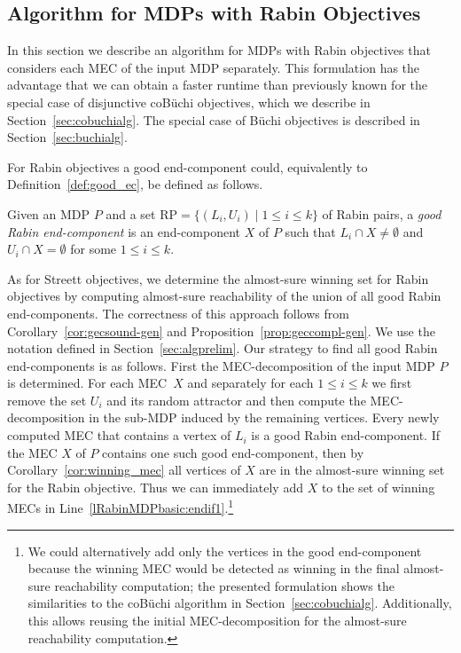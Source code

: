 \documentclass[11pt,letterpaper]{article}
\renewcommand{\RP}{\mathrm{RP}}
\newcommand{\mdp}{P\xspace}
\newcommand{\ec}{X\xspace}
\begin{document}
\subsection{Algorithm for MDPs with Rabin Objectives}
In this section we describe an algorithm for MDPs with Rabin objectives that 
considers each MEC of the input MDP separately. This formulation has the 
advantage that we can obtain a faster runtime than previously known 
for the special case of disjunctive coB{\"u}chi objectives, which we describe in
Section~\ref{sec:cobuchialg}. The special case of B{\"u}chi objectives is 
described in Section~\ref{sec:buchialg}.

For Rabin objectives a good end-component could, equivalently to 
Definition~\ref{def:good_ec}, be defined as follows.
\begin{definition}\label{def:good_rabin_ec}
  Given an MDP $\mdp$ and a set $\RP= \{(L_i, U_i) \mid 1 \le i \le k\}$ of 
  Rabin pairs, 
  a \emph{good Rabin end-component} is an end-component $\ec$ of $\mdp$ such that
  $L_i \cap \ec \ne \emptyset$ and  $U_i \cap \ec = \emptyset$ for some 
  $1 \le i \le k$.
\end{definition}
As for Streett objectives, we determine the almost-sure winning set for Rabin 
objectives by computing almost-sure reachability of the union of all good Rabin 
end-components. The correctness of this approach
follows from Corollary~\ref{cor:gecsound-gen} and Proposition~\ref{prop:geccompl-gen}.
We use the notation defined in Section~\ref{sec:algprelim}.
Our strategy to find all good Rabin end-components is as follows. First the
MEC-decomposition of the input MDP $\mdp$ is determined. For each MEC~$\ec$
and separately for each $1 \le i \le k$ we first remove the set $U_i$ and its
random attractor and then compute the MEC-decomposition in the sub-MDP induced
by the remaining vertices. Every newly computed MEC that contains a vertex of $L_i$
is a good Rabin end-component. If the MEC $\ec$ of $\mdp$ contains one such 
good end-component, then by Corollary~\ref{cor:winning_mec} all vertices of $\ec$
are in the almost-sure winning set for the Rabin objective. Thus we can immediately
add $\ec$ to the set of winning MECs in Line~\ref{lRabinMDPbasic:endif1}.\footnote{
We could alternatively add only the vertices in the good end-component because
the winning MEC would be detected as winning in the final almost-sure reachability
computation; the presented formulation shows the similarities
to the coB{\"u}chi algorithm in Section~\ref{sec:cobuchialg}. Additionally, this 
allows reusing the initial MEC-decomposition for the almost-sure reachability
computation.}
\end{document}
